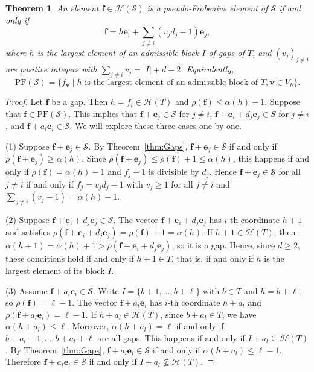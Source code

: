 \documentclass[12pt]{amsart}
\theoremstyle{plain}
\theoremstyle{theorem}
\newtheorem{theorem}[definition]{Theorem}
\theoremstyle{remark}
\begin{document}
\begin{theorem}\label{thm:PF}
An element $\mathbf{f} \in \mathcal{H}(\mathcal{S})$ is a pseudo-Frobenius element of $\mathcal{S}$ if and only if
$$\mathbf{f}=h \mathbf{e}_i+\sum_{j\neq i}(v_jd_j-1) \mathbf{e}_j,$$
where $h$ is the largest element of an admissible block $I$ of gaps of $T$, and $(v_j)_{j\neq i}$ are positive integers with $\sum_{j\neq i}v_j=|I|+d-2$. Equivalently,
$$\mathrm{PF}(\mathcal{S})=\{f_{\mathbf{v}}\mid h\text{ is the largest element of an admissible block of }T, \mathbf{v} \in V_h\}.$$
\end{theorem}
\begin{proof}
     Let $\mathbf{f}$ be a gap. Then $h=f_i\in \mathcal{H}(T)$ and $\rho(\mathbf{f}) \leq \alpha(h)-1$. Suppose that $\mathbf{f} \in \mathrm{PF}(\mathcal{S})$. This implies that $\mathbf{f}+ \mathbf{e}_j \in \mathcal{S}$ for $j \neq i$, $\mathbf{f}+ \mathbf{e}_i +  d_j\mathbf{e}_j \in S$ for $j \neq i$, and $\mathbf{f}+ a_l \mathbf{e}_i \in \mathcal{S}$. We will explore these three cases one by one. 
 
(1) Suppose $\mathbf{f}+ \mathbf{e}_j \in \mathcal{S}$. By Theorem~\ref{thm:Gaps}, $\mathbf{f}+ \mathbf{e}_j \in \mathcal{S}$ if and only if $\rho(\mathbf{f}+ \mathbf{e}_j) \geq \alpha(h)$. Since $\rho(\mathbf{f}+ \mathbf{e}_j) \leq \rho(\mathbf{f}) +1 \leq \alpha(h)$, this happens if and only if $\rho(\mathbf{f}) =\alpha(h)-1$ and $f_j+1$ is divisible by $d_j$. Hence $\mathbf{f}+ \mathbf{e}_j \in \mathcal{S}$ for all $j\neq i$ if and only if $f_j=v_jd_j-1$ with $v_j\ge1$ for all $j\neq i$ and $\sum_{j\neq i}(v_j-1)=\alpha(h)-1$.

(2) Suppose $\mathbf{f}+ \mathbf{e}_i +  d_j\mathbf{e}_j \in \mathcal{S}$. The vector $\mathbf{f}+ \mathbf{e}_i +  d_j\mathbf{e}_j$ has $i$-th coordinate $h+1$ and satisfies $\rho(\mathbf{f}+ \mathbf{e}_i +  d_j\mathbf{e}_j) = \rho(\mathbf{f})+1 = \alpha(h)$. If $h+1\in \mathcal{H}(T)$, then $\alpha(h+1)=\alpha(h)+1>\rho(\mathbf{f}+ \mathbf{e}_i +  d_j\mathbf{e}_j)$, so it is a gap. Hence, since $d \geq 2$, these conditions hold if and only if $h+1\in T$, that is, if and only if $h$ is the largest element of its block $I$. 

(3) Assume $\mathbf{f}+ a_l \mathbf{e}_i \in \mathcal{S}$. Write $I=\{b+1,\dots,b+\ell\}$ with $b\in T$ and $h=b+\ell$, so $\rho(\mathbf{f})=\ell-1$. The vector $\mathbf{f}+ a_l \mathbf{e}_i$ has $i$-th coordinate $h+a_l$ and $\rho(\mathbf{f}+ a_l \mathbf{e}_i)=\ell-1$. If $h+a_l\in \mathcal{H}(T)$, since $b+a_l\in T$, we have $\alpha(h+a_l)\leq \ell$. Moreover, $\alpha(h+a_l)= \ell$  if and only if $b+a_l+1,\dots,b+a_l+\ell$ are all gaps.  This happens if and only if $I+a_l\subseteq \mathcal{H}(T)$. By Theorem~\ref{thm:Gaps}, $\mathbf{f}+ a_l \mathbf{e}_i \in \mathcal{S}$ if and only if $\alpha(h+a_l)\leq \ell-1$. Therefore $\mathbf{f}+ a_l \mathbf{e}_i \in \mathcal{S}$ if and only if $I+a_l\not\subseteq \mathcal{H}(T)$.


\end{proof}
\end{document}
